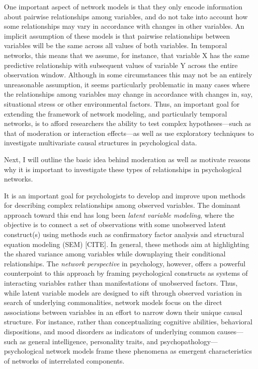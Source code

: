 One important aspect of network models is that they only encode information about pairwise relationships among variables, and do not take into account how some relationships may vary in accordance with changes in other variables. An implicit assumption of these models is that pairwise relationships between variables will be the same across all values of both variables. In temporal networks, this means that we assume, for instance, that variable X has the same predictive relationship with subsequent values of variable Y across the entire observation window. Although in some circumstances this may not be an entirely unreasonable assumption, it seems particularly problematic in many cases where the relationships among variables may change in accordance with changes in, say, situational stress or other environmental factors. Thus, an important goal for extending the framework of network modeling, and particularly temporal networks, is to afford researchers the ability to test complex hypotheses---such as that of moderation or interaction effects---as well as use exploratory techniques to investigate multivariate causal structures in psychological data. 

Next, I will outline the basic idea behind moderation as well as motivate reasons why it is important to investigate these types of relationships in psychological networks. 

It is an important goal for psychologists to develop and improve upon methods for describing complex relationships among observed variables. The dominant approach toward this end has long been \textit{latent variable modeling}, where the objective is to connect a set of observations with some unobserved latent construct(s) using methods such as confirmatory factor analysis and structural equation modeling (SEM) [CITE]. In general, these methods aim at highlighting the shared variance among variables while downplaying their conditional relationships. The \textit{network perspective} in psychology, however, offers a powerful counterpoint to this approach by framing psychological constructs as systems of interacting variables rather than manifestations of unobserved factors. Thus, while latent variable models are designed to sift through observed variation in search of underlying commonalities, network models focus on the direct associations between variables in an effort to narrow down their unique causal structure. For instance, rather than conceptualizing cognitive abilities, behavioral dispositions, and mood disorders as indicators of underlying common causes---such as general intelligence, personality traits, and psychopathology---psychological network models frame these phenomena as emergent characteristics of networks of interrelated components. 

